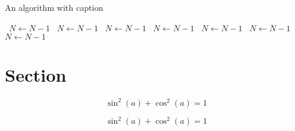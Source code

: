 \documentclass[a4paper]{article}
\begin{document}
\begin{algorithm}
\caption{An algorithm with caption}
\begin{algorithmic}
\    \State $N \gets N - 1$
\    \State $N \gets N - 1$
\    \State $N \gets N - 1$
\    \State $N \gets N - 1$
\    \State $N \gets N - 1$
\    \State $N \gets N - 1$
\    \State $N \gets N - 1$
\EndWhile
\end{algorithmic}
\end{algorithm}

\section{Section}

\[ \sin^2(a)+\cos^2(a) = 1 \]

\[ \sin^2(a)+\cos^2(a) = 1 \]
\end{document}
